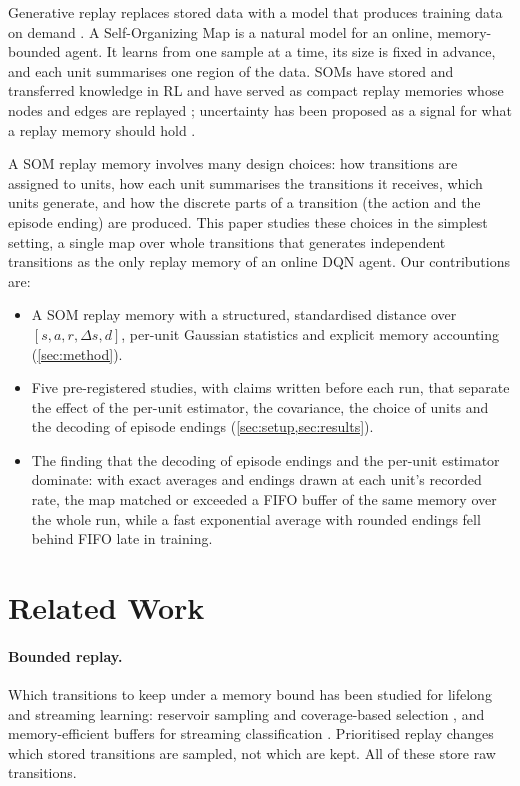 \documentclass{article}
\newcommand{\dS}{\Delta s}
\begin{document}
Generative replay replaces stored data with a model that produces training
data on demand \citep{shin2017continual}. A Self-Organizing Map
\citep[SOM;][]{kohonen1982self,kohonen2001som} is a natural model for an
online, memory-bounded agent. It learns from one sample at a time, its size
is fixed in advance, and each unit summarises one region of the data. SOMs
have stored and transferred knowledge in RL \citep{karimpanal2019som} and
have served as compact replay memories whose nodes and edges are replayed
\citep{hafez2023map}; uncertainty has been proposed as a signal for what a
replay memory should hold \citep{rajakrishnan2026uncertainty}.

A SOM replay memory involves many design choices: how transitions are
assigned to units, how each unit summarises the transitions it receives,
which units generate, and how the discrete parts of a transition (the action
and the episode ending) are produced. This paper studies these choices in the
simplest setting, a single map over whole transitions that generates
independent transitions as the only replay memory of an online DQN agent. Our
contributions are:

\begin{itemize}
\item A SOM replay memory with a structured, standardised distance over
  $[s, a, r, \dS, d]$, per-unit Gaussian statistics and explicit memory
  accounting (\cref{sec:method}).
\item Five pre-registered studies, with claims written before each run,
  that separate the effect of the per-unit estimator, the covariance, the
  choice of units and the decoding of episode endings
  (\cref{sec:setup,sec:results}).
\item The finding that the decoding of episode endings and the per-unit
  estimator dominate: with exact averages and endings drawn at each unit's
  recorded rate, the map matched or exceeded a FIFO buffer of the same memory
  over the whole run, while a fast exponential average with rounded endings
  fell behind FIFO late in training.
\end{itemize}

\section{Related Work}
\label{sec:related}

\paragraph{Bounded replay.} Which transitions to keep under a memory bound
has been studied for lifelong and streaming learning: reservoir sampling and
coverage-based selection \citep{isele2018selective}, and memory-efficient
buffers for streaming classification \citep{hayes2019memory}. Prioritised
replay \citep{schaul2016prioritized} changes which stored transitions are
sampled, not which are kept. All of these store raw transitions.
\end{document}
